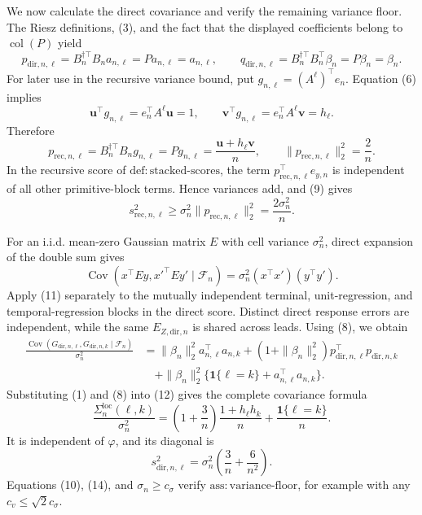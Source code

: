 We now calculate the direct covariance and verify the remaining variance
floor.  The Riesz definitions, (3), and the fact that the displayed
coefficients belong to \(\operatorname{col}(P)\) yield
\[
 p_{\mathrm{dir},n,\ell}
 =B_n^{\dagger\top}B_na_{n,\ell}=Pa_{n,\ell}=a_{n,\ell},
 \qquad
 q_{\mathrm{dir},n,\ell}
 =B_n^{\dagger\top}B_n^{\top}\beta_n=P\beta_n=\beta_n.       \tag{8}
\]
For later use in the recursive variance bound, put
\(g_{n,\ell}=(A^\ell)^{\top}e_n\).  Equation (6) implies
\[
 \boldsymbol u^{\top}g_{n,\ell}=e_n^{\top}A^\ell\boldsymbol u=1,
 \qquad
 \boldsymbol v^{\top}g_{n,\ell}=e_n^{\top}A^\ell\boldsymbol v=h_\ell.
\]
Therefore
\[
 p_{\mathrm{rec},n,\ell}
 =B_n^{\dagger\top}B_ng_{n,\ell}
 =Pg_{n,\ell}
 =\frac{\boldsymbol u+h_\ell\boldsymbol v}{n},
 \qquad
 \|p_{\mathrm{rec},n,\ell}\|_2^2=\frac2n.                  \tag{9}
\]
In the recursive score of
\(\mathrm{def{:}stacked\mbox{-}scores}\), the term
\(p_{\mathrm{rec},n,\ell}^{\top}e_{y,n}\) is independent of all other
primitive-block terms.  Hence variances add, and (9) gives
\[
 s_{\mathrm{rec},n,\ell}^2
 \geq \sigma_n^2\|p_{\mathrm{rec},n,\ell}\|_2^2
 =\frac{2\sigma_n^2}{n}.                                    \tag{10}
\]

For an i.i.d. mean-zero Gaussian matrix \(E\) with cell variance
\(\sigma_n^2\), direct expansion of the double sum gives
\[
 \operatorname{Cov}(x^{\top}Ey,x'^{\top}Ey'\mid\mathcal F_n)
 =\sigma_n^2(x^{\top}x')(y^{\top}y').                       \tag{11}
\]
Apply (11) separately to the mutually independent terminal, unit-regression,
and temporal-regression blocks in the direct score.  Distinct direct response
errors are independent, while the same \(E_{Z,\mathrm{dir},n}\) is shared
across leads.  Using (8), we obtain
\[
\begin{aligned}
 \frac{\operatorname{Cov}(G_{\mathrm{dir},n,\ell},
                           G_{\mathrm{dir},n,k}\mid\mathcal F_n)}{\sigma_n^2}
 &=\|\beta_n\|_2^2a_{n,\ell}^{\top}a_{n,k}
 +(1+\|\beta_n\|_2^2)
       p_{\mathrm{dir},n,\ell}^{\top}p_{\mathrm{dir},n,k}\\
 &\quad+\|\beta_n\|_2^2
       \{\boldsymbol 1\{\ell=k\}+a_{n,\ell}^{\top}a_{n,k}\}.
\end{aligned}                                                 \tag{12}
\]
Substituting (1) and (8) into (12) gives the complete covariance formula
\[
 \frac{\Sigma_n^{\mathrm{loc}}(\ell,k)}{\sigma_n^2}
 =\left(1+\frac3n\right)\frac{1+h_\ell h_k}{n}
  +\frac{\boldsymbol 1\{\ell=k\}}{n}.                      \tag{13}
\]
It is independent of \(\varphi\), and its diagonal is
\[
 s_{\mathrm{dir},n,\ell}^2
 =\sigma_n^2\left(\frac3n+\frac6{n^2}\right).              \tag{14}
\]
Equations (10), (14), and \(\sigma_n\geq c_\sigma\) verify
\(\mathrm{ass{:}variance\mbox{-}floor}\), for example with any
\(c_v\leq\sqrt2c_\sigma\).

